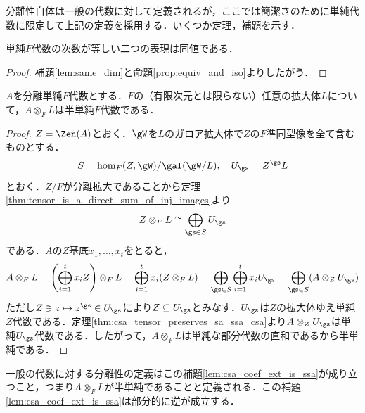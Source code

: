 \documentclass[a4paper,11pt]{jsarticle}
\begin{document}
分離性自体は一般の代数に対して定義されるが，ここでは簡潔さのために単純代数に限定して上記の定義を採用する．いくつか定理，補題を示す．
\begin{thm}[SAの表現
  ]\label{thm:sa_rep_and_ssa_reg_rep}
  単純$F$代数の次数が等しい二つの表現は同値である．
\end{thm}
\begin{proof}
  補題\ref{lem:same_dim}と命題\ref{prop:equiv_and_iso}よりしたがう．
\end{proof}
\begin{lem}[分離SAの係数拡大はSSA]\label{lem:csa_coef_ext_is_ssa}
  $A$を分離単純$F$代数とする．$F$の（有限次元とは限らない）任意の拡大体$L$について，$A\otimes_F L$は半単純$F$代数である．
\end{lem}
\begin{proof}
  $Z=\Zen(A)$とおく．$\gW$を$L$のガロア拡大体で$Z$の$F$準同型像を全て含むものとする．
  \[
    S=\hom_F(Z,\gW)/\gal(\gW/L),\quad U_\gs=Z^\gs L
  \]
  とおく．$Z/F$が分離拡大であることから定理\ref{thm:tensor_is_a_direct_sum_of_inj_images}より
  \[
    Z\otimes_F L\cong \bigoplus_{\gs\in S} U_{\gs}
  \]
  である．$A$の$Z$基底$x_1,\ldots,x_t$をとると，
  \[
    A\otimes_F L =\left(\bigoplus_{i=1}^t x_iZ\right)\otimes_F L= \bigoplus_{i=1}^t x_i(Z\otimes_F L)=\bigoplus_{\gs\in S}\bigoplus_{i=1}^t x_iU_{\gs}= \bigoplus_{\gs\in S}(A\otimes_Z U_{\gs})
  \]
  ただし$Z\ni z\mapsto z^\gs \in U_\gs$により$Z\subseteq U_\gs$とみなす．$U_\gs$は$Z$の拡大体ゆえ単純$Z$代数である．定理\ref{thm:csa_tensor_preserves_sa_ssa_csa}より$A\otimes_Z U_\gs$は単純$U_\gs$代数である．したがって，$A\otimes_F L$は単純な部分代数の直和であるから半単純である．
\end{proof}
一般の代数に対する分離性の定義はこの補題\ref{lem:csa_coef_ext_is_ssa}が成り立つこと，つまり$A\otimes_F L$が半単純であることと定義される．この補題\ref{lem:csa_coef_ext_is_ssa}は部分的に逆が成立する．
\end{document}
